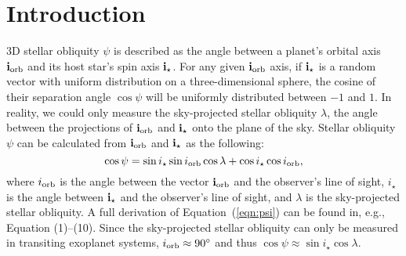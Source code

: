 \documentclass[twocolumn,times]{aastex631}
\newcommand{\numall}{161\xspace}
\begin{document}
\begin{abstract}
We find the $\lambda$ distribution of misaligned systems in the measured-$i_\star$ sample clustered at $110 \degr$, whereas of all \numall systems with sky-projected obliquity measurements is nearly uniform. The measured-$i_\star$ sample may not fully represent the population. We discuss two possible reasons: (1) the measured-$i_\star$ sample only has a small number of misaligned systems, and (2) misaligned systems are often found around hot stars, and to measure the $i_\star$ of host stars ($T_{\rm eff} > 7000$K), the gravity-darkening method is commonly used but the method is biased towards detecting perpendicular planets.
Finally, we apply our Bayesian framework to all \numall systems and assume uninformative $i_\star$ priors. The $\cos{\psi}$ piles up at 1 but is nearly uniformly distributed between $-0.75$ to $0.75$, corresponding to $\psi$ of $140\degr$ and $40\degr$. We conclude that in misaligned exoplanetary systems, the stellar spin axis is isotropically distributed around its planets' orbital axis but lacks $\psi > 140\degr$.
\end{abstract}

\section{Introduction}
\label{sec:intro}

3D stellar obliquity $\psi$ is described as the angle between a planet's orbital axis $\bf{i}_{\rm orb}$ and its host star's spin axis $\bf{i}_{\star}$.
For any given $\bf{i}_{\rm orb}$ axis, if $\bf{i}_{\star}$ is a random vector with uniform distribution on a three-dimensional sphere, the cosine of their separation angle $\cos{\psi}$ will be uniformly distributed between $-1$ and $1$.
In reality, we could only measure the sky-projected stellar obliquity $\lambda$, the angle between the projections of $\bf{i}_{\rm orb}$ and $\bf{i}_{\star}$ onto the plane of the sky. Stellar obliquity $\psi$ can be calculated from $\bf{i}_{\rm orb}$ and $\bf{i}_{\star}$ as the following:
\begin{equation}\label{eqn:psi}
    \cos{\psi} = \sin{i_\star}\sin{i_{\rm orb}}\cos{\lambda} + \cos{i_\star}\cos{i_{\rm orb}},
\end{equation}
where $i_{\rm orb}$ is the angle between the vector $\bf{i}_{\rm orb}$ and the observer's line of sight, $i_\star$ is the angle between $\bf{i}_{\star}$ and the observer's line of sight, and $\lambda$ is the sky-projected stellar obliquity. A full derivation of Equation~(\ref{eqn:psi}) can be found in, e.g., \cite{Fabrycky09} Equation (1)--(10).
Since the sky-projected stellar obliquity can only be measured in transiting exoplanet systems, $i_{\rm orb} \approx 90\mbox{$^\circ$}$ and thus $\cos{\psi} \approx \sin{i_\star}\cos{\lambda}$.
\end{document}
